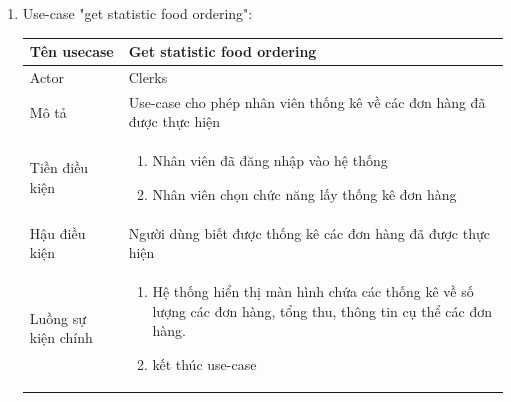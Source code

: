 \begin{enumerate}
    \item Use-case "get statistic food ordering":
    \begin{center}{\color{black}}
        \begin{tabular}{|p{5cm}|p{7cm}|} \hline
            Tên usecase &  Get statistic food ordering\\ \hline
            Actor& Clerks \\ \hline
            Mô tả& Use-case cho phép nhân viên thống kê về các đơn hàng đã được thực hiện \\ \hline
            Tiền điều kiện &
            \begin{enumerate}[1.]
                \item Nhân viên đã đăng nhập vào hệ thống
                \item Nhân viên chọn chức năng lấy thống kê đơn hàng
            \end{enumerate}\\ \hline
            Hậu điều kiện &     Người dùng biết được thống kê các đơn hàng đã được thực hiện\\ \hline
            Luồng sự kiện chính &  
                \begin{enumerate}[1.]
                    \item Hệ thống hiển thị màn hình chứa các thống kê về số lượng các đơn hàng, tổng thu, thông tin cụ thể các đơn hàng.
    				\item kết thúc use-case
                \end{enumerate} \\\hline
        \end{tabular}
    \end{center}
    

\end{enumerate}
